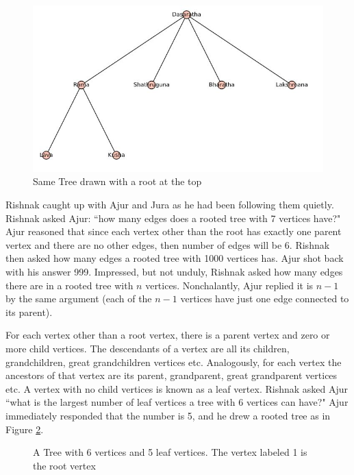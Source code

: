 \begin{figure}
\begin{center}
\includegraphics[width=\textwidth]{tree2.JPG}
\caption{Same Tree drawn with a root at the top}\label{rg2}
\end{center}
\end{figure}

Rishnak caught up with Ajur and Jura as he had been following them quietly. Rishnak asked Ajur: ``how many edges does a rooted tree with 7 vertices have?" Ajur reasoned that since each vertex other than the root has exactly one parent vertex and there are no other edges, then number of edges will be 6. Rishnak then asked how many edges a rooted tree with 1000 vertices has. Ajur shot back with his answer 999. Impressed, but not unduly, Rishnak asked how many edges there are in a rooted tree with $n$ vertices. Nonchalantly, Ajur replied it is $n-1$ by the same argument (each of the $n-1$ vertices have just one edge connected to its parent).  

For each vertex other than a root vertex, there is a parent vertex and zero or more child vertices.  The descendants of a vertex are all its children, grandchildren, great grandchildren vertices etc. Analogously, for each vertex the ancestors of that vertex are its parent, grandparent, great grandparent vertices etc. 
A vertex with no child vertices is known as a leaf vertex. Rishnak asked Ajur ``what is the largest number of leaf vertices a tree with 6 vertices can have?" Ajur immediately responded that the number is 5, and he drew a rooted tree as in Figure \ref{t1}.

\begin{figure}
\begin{center}
\caption{A Tree with 6 vertices and 5 leaf vertices. The vertex labeled 1 is the root vertex}\label{t1}
\end{center}
\end{figure}

